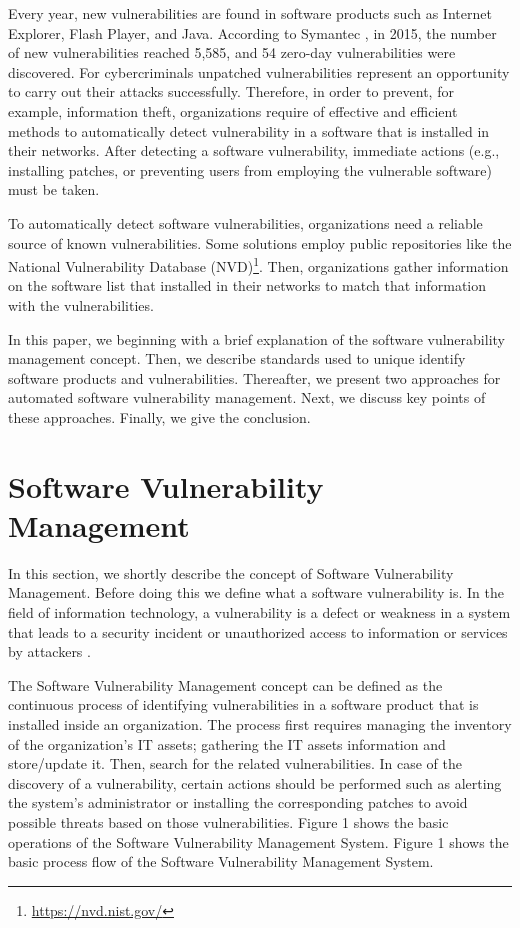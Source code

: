 \documentclass{llncs}
\begin{document}
\par Every year, new vulnerabilities are found in software products such as Internet Explorer, Flash 
 Player, and Java. According to Symantec \cite{symantec}, in 2015, the number of new vulnerabilities 
 reached 5,585, and 54 zero-day vulnerabilities were discovered. For cybercriminals 
 unpatched vulnerabilities represent an opportunity to carry out their attacks successfully. 
 Therefore, in order to prevent, for example, information theft, organizations require of 
 effective and efficient methods to automatically detect vulnerability in a software that is installed in 
 their networks. After detecting a software vulnerability, immediate actions (e.g., installing 
 patches, or preventing users from employing the vulnerable software) must be taken. 
 \par To automatically detect software vulnerabilities, organizations need a reliable source of 
 known vulnerabilities. Some solutions employ public repositories like the National 
 Vulnerability Database (NVD)\footnote{\url{https://nvd.nist.gov/}}. Then, organizations gather information on the software list that  
 installed in their networks to match that information with the vulnerabilities. 
 \par In this paper, we beginning with a brief explanation of the software vulnerability 
 management concept. Then, we describe standards used to unique identify software products 
 and vulnerabilities. Thereafter, we present two approaches for automated software vulnerability management. Next, we discuss key points of these approaches. Finally, we give the conclusion.
       
\section{Software Vulnerability Management}

In this section, we shortly describe the concept of Software Vulnerability Management. Before doing this we define what a software vulnerability is. In the field of information technology, a vulnerability is a defect or weakness in a system that leads to a security incident or unauthorized access to information or services by attackers \cite{vuln}.  

\par The Software Vulnerability Management concept can be defined as the continuous process of identifying vulnerabilities in a software product that is installed inside an organization. The process first requires managing the inventory of the organization's IT assets; gathering the IT assets information and store/update it. Then, search for the related vulnerabilities. In case of the discovery of a vulnerability, certain actions should be performed such as alerting the system's administrator or installing the corresponding patches to avoid possible threats based on those vulnerabilities. Figure 1 shows the basic operations of the Software Vulnerability Management System. Figure 1 shows the  basic process flow of the Software Vulnerability Management System.
\end{document}
